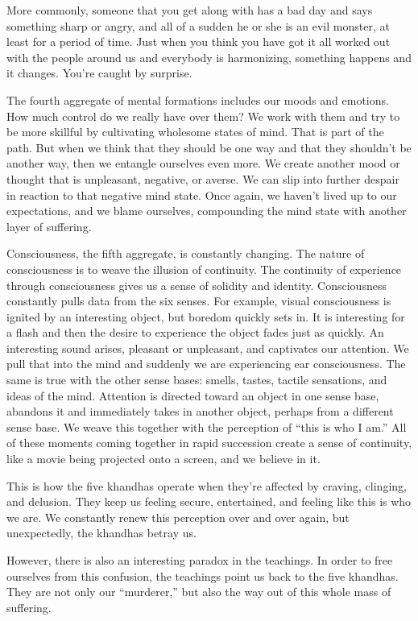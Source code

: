 More commonly, someone that you get along with has a bad day and says something sharp or angry, and all of a sudden he or she is an evil monster, at least for a period of time. Just when you think you have got it all worked out with the people around us and everybody is harmonizing, something happens and it changes. You're caught by surprise.

The fourth aggregate of mental formations includes our moods and emotions. How much control do we really have over them? We work with them and try to be more skillful by cultivating wholesome states of mind. That is part of the path. But when we think that they should be one way and that they shouldn't be another way, then we entangle ourselves even more. We create another mood or thought that is unpleasant, negative, or averse. We can slip into further despair in reaction to that negative mind state. Once again, we haven't lived up to our expectations, and we blame ourselves, compounding the mind state with another layer of suffering.

Consciousness, the fifth aggregate, is constantly changing. The nature of consciousness is to weave the illusion of continuity. The continuity of experience through consciousness gives us a sense of solidity and identity. Consciousness constantly pulls data from the six senses. For example, visual consciousness is ignited by an interesting object, but boredom quickly sets in. It is interesting for a flash and then the desire to experience the object fades just as quickly. An interesting sound arises, pleasant or unpleasant, and captivates our attention. We pull that into the mind and suddenly we are experiencing ear consciousness. The same is true with the other sense bases: smells, tastes, tactile sensations, and ideas of the mind. Attention is directed toward an object in one sense base, abandons it and immediately takes in another object, perhaps from a different sense base. We weave this together with the perception of ``this is who I am.'' All of these moments coming together in rapid succession create a sense of continuity, like a movie being projected onto a screen, and we believe in it.

This is how the five khandhas operate when they're affected by craving, clinging, and delusion. They keep us feeling secure, entertained, and feeling like this is who we are. We constantly renew this perception over and over again, but unexpectedly, the khandhas betray us.

However, there is also an interesting paradox in the teachings. In order to free ourselves from this confusion, the teachings point us back to the five khandhas. They are not only our ``murderer,'' but also the way out of this whole mass of suffering.

